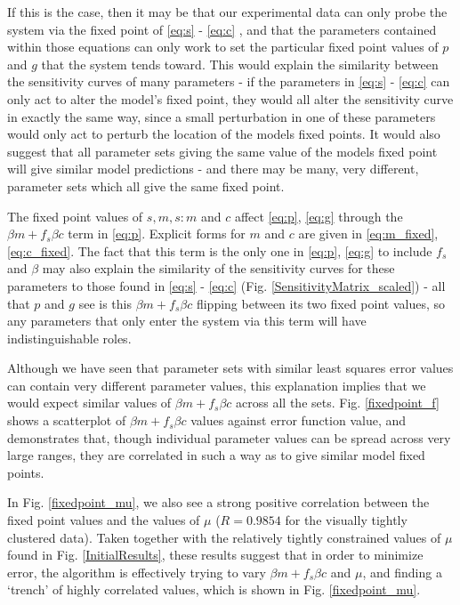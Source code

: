 \documentclass[10pt,journal]{./IEEE_latex_class/IEEEtran}
\begin{document}
If this is the case, then it may be that our experimental data can only probe the system via the fixed point of \eqref{eq:s} - \eqref{eq:c} , and that the parameters contained within those equations can only work to set the particular fixed point values of $p$ and $g$ that the system tends toward. This would explain the similarity between the sensitivity curves of many parameters - if the parameters in \eqref{eq:s} - \eqref{eq:c} can only act to alter the model's fixed point, they would all alter the sensitivity curve in exactly the same way, since a small perturbation in one of these parameters would only act to perturb the location of the models fixed points. It would also suggest that all parameter sets giving the same value of the models fixed point will give similar model predictions - and there may be many, very different, parameter sets which all give the same fixed point. 

The fixed point values of $s,m, s:m$ and $c$ affect \eqref{eq:p}, \eqref{eq:g} through the $\beta m +f_{s}\beta c$ term in \eqref{eq:p}. Explicit forms for $m$ and $c$ are given in \eqref{eq:m_fixed}, \eqref{eq:c_fixed}. The fact that this term is  the only one in \eqref{eq:p}, \eqref{eq:g} to include $f_{s}$ and $\beta$ may also explain the similarity of the sensitivity curves for these parameters to those found in \eqref{eq:s} - \eqref{eq:c} (Fig. \ref{SensitivityMatrix_scaled}) - all that $p$ and $g$ see is this $\beta m +f_{s}\beta c$ flipping between its two fixed point values, so any parameters that only enter the system via this term will have indistinguishable roles.

Although we have seen that parameter sets with similar least squares error values can contain very different parameter values, this explanation implies that we would expect similar values of $\beta m +f_{s}\beta c$ across all the sets. Fig. \ref{fixedpoint_f} shows a scatterplot of $\beta m +f_{s}\beta c$  values against error function value, and demonstrates that, though individual parameter values can be spread across very large ranges, they are correlated in such a way as to give similar model fixed points. 

In Fig. \ref{fixedpoint_mu}, we also see a strong positive correlation between the fixed point values and the values of $\mu$ ($R = 0.9854$ for the visually tightly clustered data). Taken together with the relatively tightly constrained values of $\mu$ found in Fig. \ref{InitialResults}, these results suggest that in order to minimize error, the algorithm is effectively trying to vary $\beta m +f_{s}\beta c$ and $\mu$, and finding a `trench' of highly correlated values, which is shown in Fig. \ref{fixedpoint_mu}. 
\end{document}

